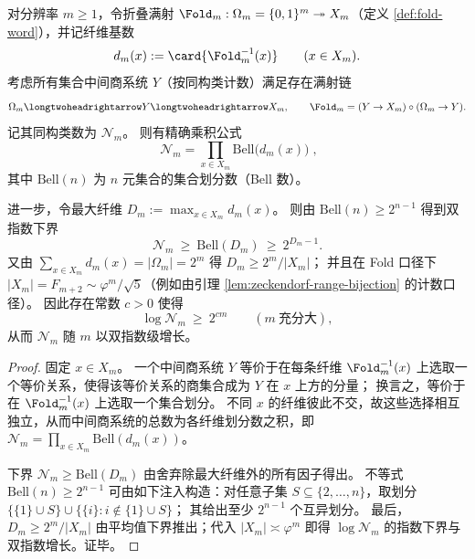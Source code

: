 \begin{proposition}\label{prop:fold-intermediate-quotients-bell-product-doubleexponential}
对分辨率 \(m\ge 1\)，令折叠满射 \(\Fold_m:\Omega_m=\{0,1\}^m\twoheadrightarrow X_m\)（定义 \ref{def:fold-word}），并记纤维基数
\[
d_m(x):=\card{\Fold_m^{-1}(x)}\qquad(x\in X_m).
\]
考虑所有集合中间商系统 \(Y\)（按同构类计数）满足存在满射链
\[
\Omega_m\longtwoheadrightarrow Y\longtwoheadrightarrow X_m,
\qquad
\Fold_m=(Y\to X_m)\circ(\Omega_m\to Y).
\]
记其同构类数为 \(\mathcal N_m\)。
则有精确乘积公式
\[
\boxed{\;\mathcal N_m=\prod_{x\in X_m}\mathrm{Bell}\!\bigl(d_m(x)\bigr)\;},
\]
其中 \(\mathrm{Bell}(n)\) 为 \(n\) 元集合的集合划分数（Bell 数）。
\par
进一步，令最大纤维 \(D_m:=\max_{x\in X_m}d_m(x)\)。
则由 \(\mathrm{Bell}(n)\ge 2^{n-1}\) 得到双指数下界
\[
\mathcal N_m\ \ge\ \mathrm{Bell}(D_m)\ \ge\ 2^{D_m-1}.
\]
又由 \(\sum_{x\in X_m}d_m(x)=|\Omega_m|=2^m\) 得 \(D_m\ge 2^m/|X_m|\)；
并且在 Fold 口径下 \(|X_m|=F_{m+2}\sim \varphi^m/\sqrt5\)（例如由引理 \ref{lem:zeckendorf-range-bijection} 的计数口径）。
因此存在常数 \(c>0\) 使得
\[
\log \mathcal N_m\ \ge\ 2^{c m}\qquad(m\ \text{充分大}),
\]
从而 \(\mathcal N_m\) 随 \(m\) 以双指数级增长。
\end{proposition}
\begin{proof}
固定 \(x\in X_m\)。
一个中间商系统 \(Y\) 等价于在每条纤维 \(\Fold_m^{-1}(x)\) 上选取一个等价关系，使得该等价关系的商集合成为 \(Y\) 在 \(x\) 上方的分量；
换言之，等价于在 \(\Fold_m^{-1}(x)\) 上选取一个集合划分。
不同 \(x\) 的纤维彼此不交，故这些选择相互独立，从而中间商系统的总数为各纤维划分数之积，即
\(
\mathcal N_m=\prod_{x\in X_m}\mathrm{Bell}(d_m(x))
\)。
\par
下界 \(\mathcal N_m\ge \mathrm{Bell}(D_m)\) 由舍弃除最大纤维外的所有因子得出。
不等式 \(\mathrm{Bell}(n)\ge 2^{n-1}\) 可由如下注入构造：对任意子集 \(S\subseteq\{2,\dots,n\}\)，取划分 \(\{ \{1\}\cup S\}\cup\{\{i\}:i\notin \{1\}\cup S\}\)；
其给出至少 \(2^{n-1}\) 个互异划分。
最后，\(D_m\ge 2^m/|X_m|\) 由平均值下界推出；代入 \(|X_m|\asymp \varphi^m\) 即得 \(\log \mathcal N_m\) 的指数下界与双指数增长。证毕。
\end{proof}

\endinput
